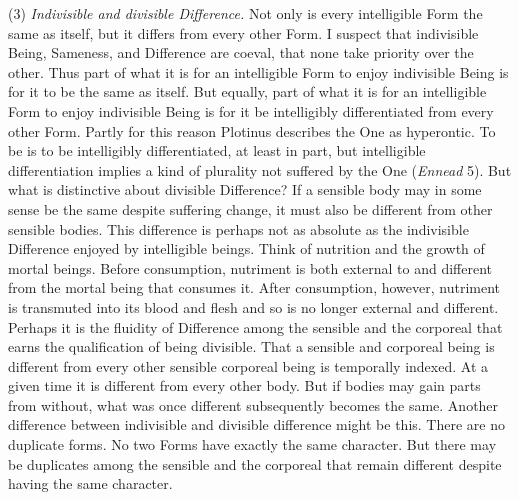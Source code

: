(3) \emph{Indivisible and divisible Difference.} Not only is every intelligible Form the same as itself, but it differs from every other Form. I suspect that indivisible Being, Sameness, and Difference are coeval, that none take priority over the other. Thus part of what it is for an intelligible Form to enjoy indivisible Being is for it to be the same as itself. But equally, part of what it is for an intelligible Form to enjoy indivisible Being is for it be intelligibly differentiated from every other Form. Partly for this reason Plotinus describes the One as hyperontic. To be is to be intelligibly differentiated, at least in part, but intelligible differentiation implies a kind of plurality not suffered by the One (\emph{Ennead} 5). But what is distinctive about divisible Difference? If a sensible body may in some sense be the same despite suffering change, it must also be different from other sensible bodies. This difference is perhaps not as absolute as the indivisible Difference enjoyed by intelligible beings. Think of nutrition and the growth of mortal beings. Before consumption, nutriment is both external to and different from the mortal being that consumes it. After consumption, however, nutriment is transmuted into its blood and flesh and so is no longer external and different. Perhaps it is the fluidity of Difference among the sensible and the corporeal that earns the qualification of being divisible. That a sensible and corporeal being is different from every other sensible corporeal being is temporally indexed. At a given time it is different from every other body. But if bodies may gain parts from without, what was once different subsequently becomes the same. Another difference between indivisible and divisible difference might be this. There are no duplicate forms. No two Forms have exactly the same character. But there may be duplicates among the sensible and the corporeal that remain different despite having the same character.

